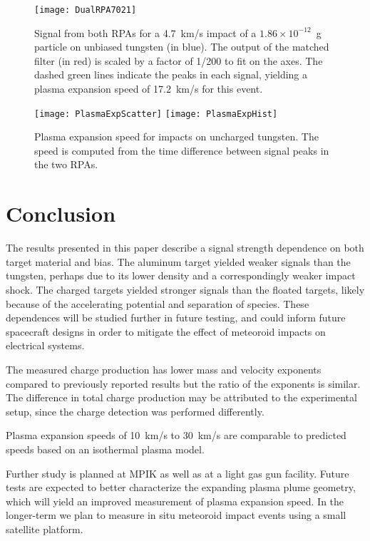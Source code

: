 \begin{figure}[\floatplace]
\begin{center}
\texttt{[image: DualRPA7021]}
\end{center}
\caption{\label{fig.DualRPA7021} Signal from both RPAs for a 4.7~km/s impact of a $1.86\times10^{-12}$~g particle on unbiased tungsten (in blue).  The output of the matched filter (in red) is scaled by a factor of 1/200 to fit on the axes.  The dashed green lines indicate the peaks in each signal, yielding a plasma expansion speed of 17.2~km/s for this event.}
\end{figure}

\begin{figure}[\floatplace]
\begin{center}
\texttt{[image: PlasmaExpScatter]}
\texttt{[image: PlasmaExpHist]}
\end{center}
\caption{\label{fig.PlasmaExp} Plasma expansion speed for impacts on uncharged tungsten.  The speed is computed from the time difference between signal peaks in the two RPAs.}
\end{figure}

\section{Conclusion}
\label{sec.Conclusion}

The results presented in this paper describe a signal strength dependence on both target material and bias.  The aluminum target yielded weaker signals than the tungsten, perhaps due to its lower density and a correspondingly weaker impact shock.  The charged targets yielded stronger signals than the floated targets, likely because of the accelerating potential and separation of species.  These dependences will be studied further in future testing, and could inform future spacecraft designs in order to mitigate the effect of meteoroid impacts on electrical systems.

The measured charge production has lower mass and velocity exponents compared to previously reported results but the ratio of the exponents is similar.  The difference in total charge production may be attributed to the experimental setup, since the charge detection was performed differently.

Plasma expansion speeds of 10~km/s to 30~km/s are comparable to predicted speeds based on an isothermal plasma model.

Further study is planned at MPIK as well as at a light gas gun facility.  Future tests are expected to better characterize the expanding plasma plume geometry, which will yield an improved measurement of plasma expansion speed.  In the longer-term we plan to measure in situ meteoroid impact events using a small satellite platform.


